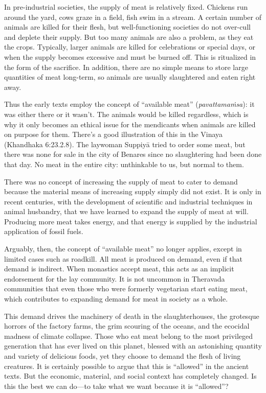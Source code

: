 \documentclass[12pt,openany]{book}%
\begin{document}
In pre-industrial societies, the supply of meat is relatively fixed. Chickens run around the yard, cows graze in a field, fish swim in a stream. A certain number of animals are killed for their flesh, but well-functioning societies do not over-cull and deplete their supply. But too many animals are also a problem, as they eat the crops. Typically, larger animals are killed for celebrations or special days, or when the supply becomes excessive and must be burned off. This is ritualized in the form of the sacrifice. In addition, there are no simple means to store large quantities of meat long-term, so animals are usually slaughtered and eaten right away.

Thus the early texts employ the concept of “available meat” (\textit{\textsanskrit{pavattamaṁsa}}): it was either there or it wasn’t. The animals would be killed regardless, which is why it only becomes an ethical issue for the mendicants when animals are killed on purpose for them. There’s a good illustration of this in the Vinaya (Khandhaka 6:23.2.8). The laywoman \textsanskrit{Suppiyā} tried to order some meat, but there was none for sale in the city of Benares since no slaughtering had been done that day. No meat in the entire city: unthinkable to us, but normal to them.

There was no concept of increasing the supply of meat to cater to demand because the material means of increasing supply simply did not exist. It is only in recent centuries, with the development of scientific and industrial techniques in animal husbandry, that we have learned to expand the supply of meat at will. Producing more meat takes energy, and that energy is supplied by the industrial application of fossil fuels.

Arguably, then, the concept of “available meat” no longer applies, except in limited cases such as roadkill. All meat is produced on demand, even if that demand is indirect. When monastics accept meat, this acts as an implicit endorsement for the lay community. It is not uncommon in Theravada communities that even those who were formerly vegetarian start eating meat, which contributes to expanding demand for meat in society as a whole.

This demand drives the machinery of death in the slaughterhouses, the grotesque horrors of the factory farms, the grim scouring of the oceans, and the ecocidal madness of climate collapse. Those who eat meat belong to the most privileged generation that has ever lived on this planet, blessed with an astonishing quantity and variety of delicious foods, yet they choose to demand the flesh of living creatures. It is certainly possible to argue that this is “allowed” in the ancient texts. But the economic, material, and social context has completely changed. Is this the best we can do—to take what we want because it is “allowed”?
\end{document}
